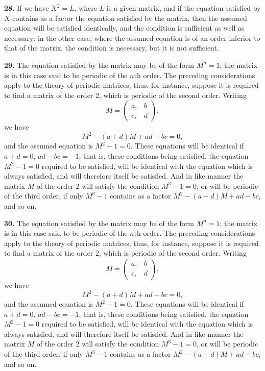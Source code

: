 \documentclass[11pt,a4paper]{book}
\begin{document}
\begin{center}
\medskip
\noindent\textbf{28.} If we have $X^2 = L$, where $L$ is a given matrix, and if the equation satisfied by $X$ contains as a factor the equation satisfied by the matrix, then the assumed equation will be satisfied identically, and the condition is sufficient as well as necessary: in the other case, where the assumed equation is of an order inferior to that of the matrix, the condition is necessary, but it is not sufficient.

\medskip
\noindent\textbf{29.} The equation satisfied by the matrix may be of the form $M^n = 1$; the matrix is in this case said to be periodic of the $n$th order. The preceding considerations apply to the theory of periodic matrices; thus, for instance, suppose it is required to find a matrix of the order 2, which is periodic of the second order. Writing
\[
M = \begin{pmatrix} a, & b \\ c, & d \end{pmatrix},
\]
we have
\[M^2 - (a+d)M + ad-bc = 0,\]
and the assumed equation is $M^2 - 1 = 0$. These equations will be identical if $a+d=0$, $ad-bc=-1$, that is, these conditions being satisfied, the equation $M^2-1=0$ required to be satisfied, will be identical with the equation which is always satisfied, and will therefore itself be satisfied. And in like manner the matrix $M$ of the order 2 will satisfy the condition $M^3-1=0$, or will be periodic of the third order, if only $M^3-1$ contains as a factor $M^2-(a+d)M+ad-bc$, and so on.

\medskip
\noindent\textbf{30.} The equation satisfied by the matrix may be of the form $M^n = 1$; the matrix is in this case said to be periodic of the $n$th order. The preceding considerations apply to the theory of periodic matrices; thus, for instance, suppose it is required to find a matrix of the order 2, which is periodic of the second order. Writing
\[
M = \begin{pmatrix} a, & b \\ c, & d \end{pmatrix},
\]
we have
\[M^2 - (a+d)M + ad-bc = 0,\]
and the assumed equation is $M^2 - 1 = 0$. These equations will be identical if $a+d=0$, $ad-bc=-1$, that is, these conditions being satisfied, the equation $M^2-1=0$ required to be satisfied, will be identical with the equation which is always satisfied, and will therefore itself be satisfied. And in like manner the matrix $M$ of the order 2 will satisfy the condition $M^3-1=0$, or will be periodic of the third order, if only $M^3-1$ contains as a factor $M^2-(a+d)M+ad-bc$, and so on.


\end{center}
\end{document}
